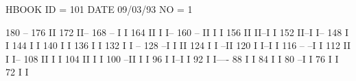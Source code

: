 \begin{Listing}
 HBOOK     ID =       101                                        DATE  09/03/93              NO =     1
 
      180                                                                   --
      176                                                                   II
      172                                                                   II--
      168                                                               --  I  I
      164                                                               II  I  I--
      160                                                           --  II  I    I
      156                                                           II  II--I    I
      152                                                           II--I        I--
      148                                                           I              I
      144                                                           I              I
      140                                                           I              I
      136                                                           I              I
      132                                                           I              I    --
      128                                                         --I              I    II
      124                                                         I                I  --II
      120                                                         I                I--I  I
      116                                                   --  --I                      I
      112                                                   II  I                        I--
      108                                                   II  I                          I
      104                                                   II  I                          I
      100                                                 --II  I                          I
       96                                                 I  I--I                          I
       92                                                 I                                I----
       88                                                 I                                    I
       84                                                 I                                    I
       80                                               --I                                    I
       76                                               I                                      I
       72                                               I                                      I

\end{Listing}
